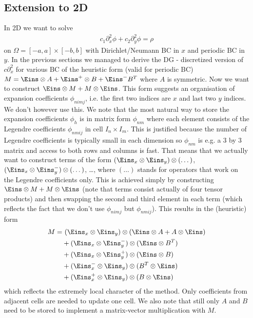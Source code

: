 \documentclass[a4paper,12pt]{scrartcl}
\begin{document}
\subsection{Extension to 2D}
In 2D we want to solve
\begin{align}
    c_1\partial_x^2 \phi + c_2 \partial_y^2 \phi = \rho
    \label{}
\end{align}
on $\Omega = [-a,a]\times[-b,b]$ with Dirichlet/Neumann BC in $x$ and periodic BC
in $y$. 
In the previous sections we managed to derive the DG - discretized version of
$c\partial_x^2$ for various BC of the heuristic form (valid for periodic BC)
$M = \Eins\otimes A + \Eins^+ \otimes B + \Eins^- B^T$ where $A$ is symmetric.
Now we want to construct $\Eins\otimes M  + M \otimes \Eins$. This form 
suggests an organisation of expansion coefficients $\phi_{nimj}$, i.e. the 
first two indices are $x$ and last two $y$ indices. 
We don't however
use this. 
We note that
the most natural way to store the expansion coefficients $\phi_h$ is in matrix
form $\phi_{nm}$ where each element consists of the Legendre coefficients $\phi_{nmij}$
in cell $I_n\times I_m$. This is justified because the number of Legendre 
coefficients is typically small in each dimension so $\phi_{nm}$ is e.g. a 
$3$ by $3$ matrix and access to both rows and columns is fast.
That means that we actually want to construct terms of the form
    $(\Eins_x\otimes \Eins_y) \otimes( \dots)$, 
    $(\Eins_x\otimes \Eins^-_y) \otimes( \dots)$, \dots, 
where $(\dots)$ stands for operators that work on the Legendre coefficients only.
This is achieved simply by constructing $\Eins\otimes M  + M \otimes \Eins$ 
(note that terms consist actually of four tensor products) and then swapping the 
second and third element in each term (which reflects the fact that we don't use
$\phi_{nimj}$ but $\phi_{nmij}$). This results in the (heuristic) form
\begin{align}
    M =&\ (\Eins_x\otimes\Eins_y) \otimes (\Eins\otimes A + A\otimes \Eins) \nonumber\\
     &+ (\Eins_x\otimes\Eins_y^-) \otimes( \Eins\otimes B^T) \nonumber \\
     &+ (\Eins_x\otimes\Eins_y^+) \otimes( \Eins\otimes B) \nonumber \\
     &+ (\Eins_x^-\otimes\Eins_y) \otimes( B^T \otimes \Eins) \nonumber \\
     &+ (\Eins_x^+\otimes\Eins_y) \otimes( B\otimes \Eins) 
    \label{}
\end{align}
which reflects the extremely local character of the method. Only coefficients from 
adjacent cells are needed to update one cell. We also note that still only $A$ and 
$B$ need to be stored to implement a matrix-vector multiplication with $M$.
\end{document}

